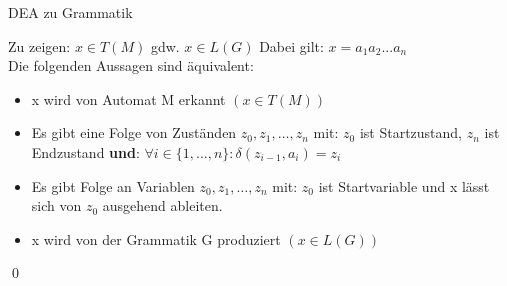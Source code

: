 \begin{frame}{DEA zu Grammatik}
    \begin{alertblock}{Zu zeigen: $x \in T(M)$ gdw. $x \in L(G)$}
    Dabei gilt: $x=a_1 a_2 ... a_n$\\
    Die folgenden Aussagen sind äquivalent:
        \begin{itemize}
            \item x wird von Automat M erkannt \emph{$(x\in T(M))$}
            \item Es gibt eine Folge von Zuständen $z_0, z_1, \dots, z_n$ mit: $z_0$ ist Startzustand, $z_n$ ist Endzustand \textbf{und}: $\forall i \in \{1, ..., n\}: \delta(z_{i-1}, a_i)=z_i$
            \item Es gibt Folge an Variablen $z_0, z_1, \dots, z_n$ mit: $z_0$ ist Startvariable und x lässt sich von $z_0$ ausgehend ableiten.
            \item x wird von der Grammatik G produziert \emph{$(x \in L(G))$}
        \end{itemize}
        \qed
    \end{alertblock}
\end{frame}



        
